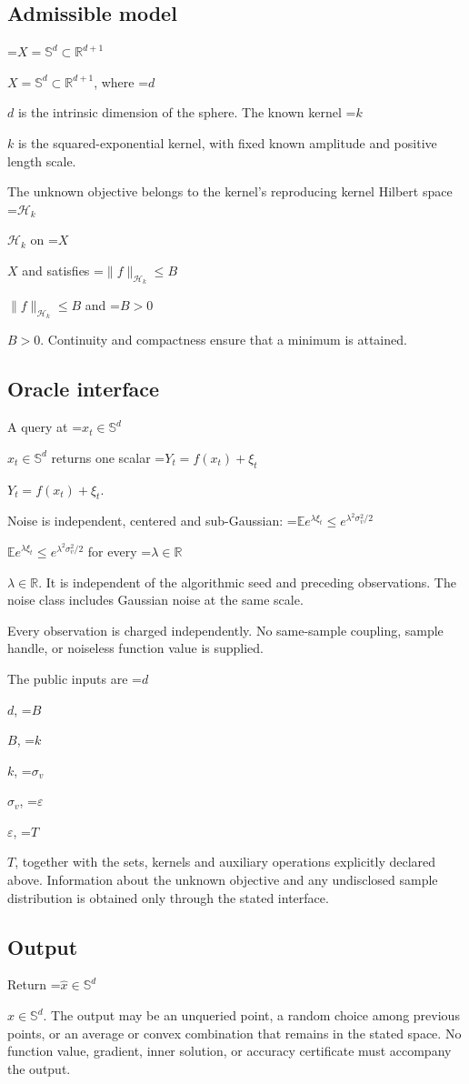 \documentclass[10pt,a4paper]{article}
\newcommand{\AtlasMath}[1]{\par\begingroup\centering\setbox0=\hbox{$\displaystyle #1$}\ifdim\wd0>1.4\linewidth\typeout{ATLAS WIDE FORMULA: \the\wd0}\fi\ifdim\wd0>\linewidth\resizebox{\linewidth}{!}{\box0}\else\box0\fi\par\endgroup}
\newcommand{\AtlasInlineMath}[1]{\begingroup\setbox0=\hbox{$#1$}\ifdim\wd0>.4\linewidth\endgroup\AtlasMath{#1}\else\endgroup$#1$\fi}
\begin{document}
\subsection{Admissible model}
\AtlasInlineMath{X=\mathbb{S}^d\subset\mathbb{R}^{d+1}}, where \AtlasInlineMath{d} is the intrinsic dimension of the sphere. The known kernel \AtlasInlineMath{k} is the squared-exponential kernel, with fixed known amplitude and positive length scale.

The unknown objective belongs to the kernel's reproducing kernel Hilbert space \AtlasInlineMath{\mathcal{H}_k} on \AtlasInlineMath{X} and satisfies \AtlasInlineMath{\|f\|_{\mathcal{H}_k}\le B} and \AtlasInlineMath{B>0}. Continuity and compactness ensure that a minimum is attained.

\subsection{Oracle interface}
A query at \AtlasInlineMath{x_t\in \mathbb{S}^d} returns one scalar \AtlasInlineMath{Y_t=f(x_t)+\xi_t}.

Noise is independent, centered and sub-Gaussian: \AtlasInlineMath{\mathbb{E} e^{\lambda\xi_t}\le e^{\lambda^2 \sigma_v^2/2}} for every \AtlasInlineMath{\lambda\in\mathbb{R}}. It is independent of the algorithmic seed and preceding observations. The noise class includes Gaussian noise at the same scale.

Every observation is charged independently. No same-sample coupling, sample handle, or noiseless function value is supplied.

The public inputs are \AtlasInlineMath{d}, \AtlasInlineMath{B}, \AtlasInlineMath{k}, \AtlasInlineMath{\sigma_v}, \AtlasInlineMath{\varepsilon}, \AtlasInlineMath{T}, together with the sets, kernels and auxiliary operations explicitly declared above. Information about the unknown objective and any undisclosed sample distribution is obtained only through the stated interface.

\subsection{Output}
Return \AtlasInlineMath{\widehat{x}\in \mathbb{S}^d}. The output may be an unqueried point, a random choice among previous points, or an average or convex combination that remains in the stated space. No function value, gradient, inner solution, or accuracy certificate must accompany the output.
\end{document}

